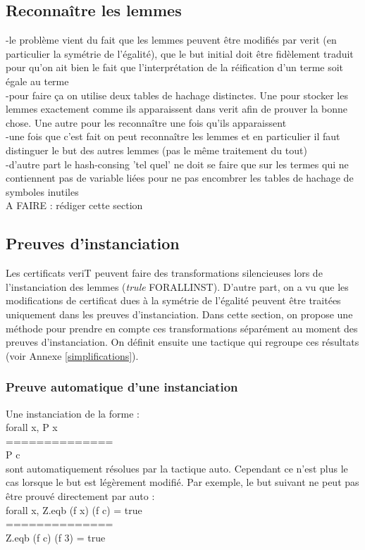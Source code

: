 \documentclass[11pt]{article}
\begin{document}
\subsection{Reconnaître les lemmes}
-le problème vient du fait que les lemmes peuvent être modifiés par verit (en particulier la symétrie de l'égalité), que le but initial doit être fidèlement traduit pour qu'on ait bien le fait que l'interprétation de la réification d'un terme soit égale au terme \\
-pour faire ça on utilise deux tables de hachage distinctes. Une pour stocker les lemmes exactement comme ils apparaissent dans verit afin de prouver la bonne chose. Une autre pour les reconnaître une fois qu'ils apparaissent\\
-une fois que c'est fait on peut reconnaître les lemmes et en particulier il faut distinguer le but des autres lemmes (pas le même traitement du tout)\\
-d'autre part le hash-consing 'tel quel' ne doit se faire que sur les termes qui ne contiennent pas de variable liées pour ne pas encombrer les tables de hachage de symboles inutiles\\

A FAIRE : rédiger cette section



\subsection{Preuves d'instanciation}

Les certificats veriT peuvent faire des transformations silencieuses lors de l'instanciation des lemmes (\textit{trule} FORALLINST). D'autre part, on a vu que les modifications de certificat dues à la symétrie de l'égalité peuvent être traitées uniquement dans les preuves d'instanciation. Dans cette section, on propose une méthode pour prendre en compte ces transformations séparément au moment des preuves d'instanciation. On définit ensuite une tactique qui regroupe ces résultats (voir Annexe \ref{simplifications}).

\subsubsection{Preuve automatique d'une instanciation}

Une instanciation de la forme :\\
forall x, P x \\
==============\\
P c \\
sont automatiquement résolues par la tactique auto. Cependant ce n'est plus le cas lorsque le but est légèrement modifié. Par exemple, le but suivant ne peut pas être prouvé directement par auto : \\
forall x, Z.eqb (f x) (f c) = true \\
==============\\
Z.eqb (f c) (f 3) = true \\
\end{document}
